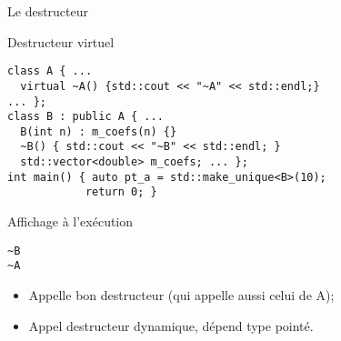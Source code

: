 \documentclass[compress,10pt,aspectratio=169]{beamer}
\begin{document}
\begin{frame}[fragile]{Le destructeur}
\vspace*{-4mm}
\begin{minipage}{\textwidth}  
  \begin{block}{\small Destructeur virtuel}
  \vspace*{-2mm}
  \begin{minipage}{0.48\textwidth}
    \begin{verbatim}
class A { ...
  virtual ~A() {std::cout << "~A" << std::endl;}
... };
class B : public A { ...
  B(int n) : m_coefs(n) {}
  ~B() { std::cout << "~B" << std::endl; }
  std::vector<double> m_coefs; ... };
int main() { auto pt_a = std::make_unique<B>(10);
            return 0; }
\end{verbatim}
\end{minipage}\hfill
  \begin{minipage}{0.48\textwidth}
  \begin{block}{\small Affichage à l'exécution}
  \vspace*{-1mm}
  \begin{tcolorbox}[colback=black,coltext=white]
  \begin{verbatim}
~B
~A
\end{verbatim}
\end{tcolorbox}
  \begin{itemize}
  \item Appelle  bon destructeur (qui appelle aussi celui de A);
  \item Appel destructeur dynamique, dépend type pointé.
  \end{itemize}
  \end{block}
  \end{minipage}
  \end{block}
\end{minipage}
  \end{frame}
  
\end{document}
